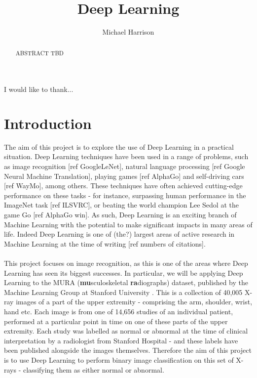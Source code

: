 \documentclass[11pt]{article} %
\title{Deep Learning}
\author{Michael Harrison}
\theoremstyle{plain}
\theoremstyle{definition}
\begin{document}
\maketitle

\declaration

\begin{acknowledgement}
I would like to thank...
\end{acknowledgement}

\begin{abstract}
ABSTRACT TBD
\end{abstract}


\newpage
\setcounter{page}{1}
\section{Introduction}
The aim of this project is to explore the use of Deep Learning in a practical situation. Deep Learning techniques have been used in a range of problems, such as image recognition [ref GoogleLeNet], natural language processing [ref Google Neural Machine Translation], playing games [ref AlphaGo] and self-driving cars [ref WayMo], among others. These techniques have often achieved cutting-edge performance on these tasks - for instance, surpassing human performance in the ImageNet task [ref ILSVRC], or beating the world champion Lee Sedol at the game Go [ref AlphaGo win]. As such, Deep Learning is an exciting branch of Machine Learning with the potential to make significant impacts in many areas of life. Indeed Deep Learning is one of (the?) largest areas of active research in Machine Learning at the time of writing [ref numbers of citations].
\\
\\
\noindent
This project focuses on image recognition, as this is one of the areas where Deep Learning has seen its biggest successes. In particular, we will be applying Deep Learning to the MURA (\textbf{mu}sculoskeletal \textbf{ra}diographs) dataset, published by the Machine Learning Group at Stanford University \cite{MURA2017}. This is a collection of 40,005 X-ray images of a part of the upper extremity - comprising the arm, shoulder, wrist, hand etc. Each image is from one of 14,656 studies of an individual patient, performed at a particular point in time on one of these parts of the upper extremity. Each study was labelled as normal or abnormal at the time of clinical interpretation by a radiologist from Stanford Hospital - and these labels have been published alongside the images themselves. Therefore the aim of this project is to use Deep Learning to perform binary image classification on this set of X-rays - classifying them as either normal or abnormal.
\end{document}
